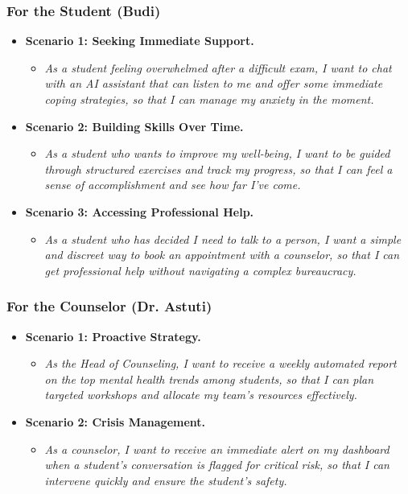 \subsubsection{For the Student (Budi)}
\begin{itemize}
    \item \textbf{Scenario 1: Seeking Immediate Support.}
        \begin{itemize}
            \item \textit{As a student feeling overwhelmed after a difficult exam, I want to chat with an AI assistant that can listen to me and offer some immediate coping strategies, so that I can manage my anxiety in the moment.}
        \end{itemize}
    \item \textbf{Scenario 2: Building Skills Over Time.}
        \begin{itemize}
            \item \textit{As a student who wants to improve my well-being, I want to be guided through structured exercises and track my progress, so that I can feel a sense of accomplishment and see how far I've come.}
        \end{itemize}
    \item \textbf{Scenario 3: Accessing Professional Help.}
        \begin{itemize}
            \item \textit{As a student who has decided I need to talk to a person, I want a simple and discreet way to book an appointment with a counselor, so that I can get professional help without navigating a complex bureaucracy.}
        \end{itemize}
\end{itemize}

\subsubsection{For the Counselor (Dr. Astuti)}
\begin{itemize}
    \item \textbf{Scenario 1: Proactive Strategy.}
        \begin{itemize}
            \item \textit{As the Head of Counseling, I want to receive a weekly automated report on the top mental health trends among students, so that I can plan targeted workshops and allocate my team's resources effectively.}
        \end{itemize}
    \item \textbf{Scenario 2: Crisis Management.}
        \begin{itemize}
            \item \textit{As a counselor, I want to receive an immediate alert on my dashboard when a student's conversation is flagged for critical risk, so that I can intervene quickly and ensure the student's safety.}
        \end{itemize}
\end{itemize}

